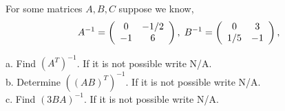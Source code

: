 \documentclass{ximera}
\begin{document}
\begin{exercise}
For some matrices $A, B, C$ suppose we know,
\[ A^{-1} = \left(\begin{array}{ccc}
 0 & -1/2 \\
-1 & 6
\end{array}\right), \hspace{.1cm} B^{-1} =
\left(\begin{array}{ccc}
0 & 3  \\
1/5 & -1
\end{array}\right), \]

a. Find $\left(A^{T}\right)^{-1}$. If it is not possible write N/A. \\
b. Determine $\left((AB)^{T}\right)^{-1}$. If it is not possible write N/A.\\
c. Find $\left(3BA\right)^{-1}$. If it is not possible write N/A.
\end{exercise}
\end{document}
